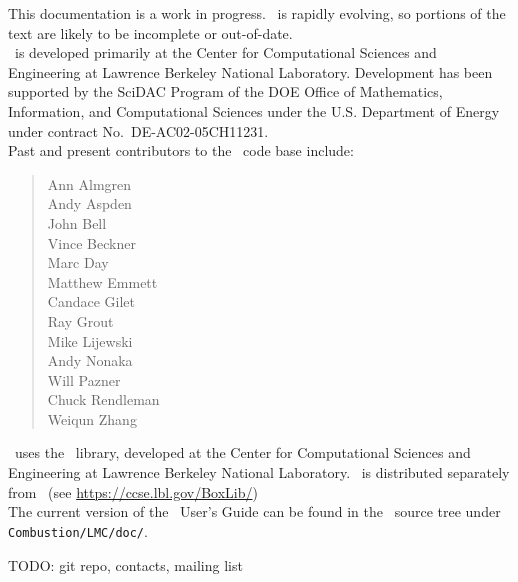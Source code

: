 This documentation is a work in progress.  \lmc\ is rapidly
evolving, so portions of the text are likely to be incomplete or
out-of-date. \\

\noindent \lmc\ is developed primarily at the Center for Computational Sciences and
Engineering at Lawrence Berkeley National Laboratory.  Development has been supported
by the SciDAC Program of the DOE Office of Mathematics, Information, and Computational Sciences
under the U.S. Department of Energy under contract No.\ DE-AC02-05CH11231. \\

Past and present contributors to the \lmc\ code base include: %
\begin{quote}
Ann Almgren\\
Andy Aspden\\
John Bell\\
Vince Beckner\\
Marc Day\\
Matthew Emmett\\
Candace Gilet\\
Ray Grout\\
Mike Lijewski\\
Andy Nonaka\\
Will Pazner\\
Chuck Rendleman\\
Weiqun Zhang\\
\end{quote}

\noindent \lmc\ uses the \boxlib\ library,
developed at the Center for Computational Sciences and Engineering at
Lawrence Berkeley National Laboratory.  \boxlib\ is distributed
separately from \lmc\ (see
\url{https://ccse.lbl.gov/BoxLib/})
\\

\noindent The current version of the \lmc\ User's Guide can be found in 
the \combustion\ source tree under {\tt Combustion/LMC/doc/}.

TODO: git repo, contacts, mailing list
